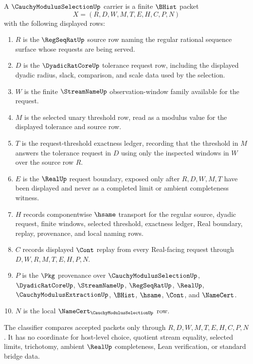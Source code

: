 \begin{definition}
\label{def:cauchy-modulus-selection-carrier}
A $\CauchyModulusSelectionUp$ carrier is a finite $\BHist$ packet
$$
X=(R,D,W,M,T,E,H,C,P,N)
$$
with the following displayed rows:
\begin{enumerate}
\item $R$ is the $\RegSeqRatUp$ source row naming the regular rational sequence surface whose requests are being served.
\item $D$ is the $\DyadicRatCoreUp$ tolerance request row, including the displayed dyadic radius, slack, comparison, and scale data used by the selection.
\item $W$ is the finite $\StreamNameUp$ observation-window family available for the request.
\item $M$ is the selected unary threshold row, read as a modulus value for the displayed tolerance and source row.
\item $T$ is the request-threshold exactness ledger, recording that the threshold in $M$ answers the tolerance request in $D$ using only the inspected windows in $W$ over the source row $R$.
\item $E$ is the $\RealUp$ request boundary, exposed only after $R,D,W,M,T$ have been displayed and never as a completed limit or ambient completeness witness.
\item $H$ records componentwise $\hsame$ transport for the regular source, dyadic request, finite windows, selected threshold, exactness ledger, Real boundary, replay, provenance, and local naming rows.
\item $C$ records displayed $\Cont$ replay from every Real-facing request through $D,W,R,M,T,E,H,P,N$.
\item $P$ is the $\Pkg$ provenance over $\CauchyModulusSelectionUp$, $\DyadicRatCoreUp$, $\StreamNameUp$, $\RegSeqRatUp$, $\RealUp$, $\CauchyModulusExtractionUp$, $\BHist$, $\hsame$, $\Cont$, and $\NameCert$.
\item $N$ is the local $\NameCert_{\CauchyModulusSelectionUp}$ row.
\end{enumerate}
The classifier compares accepted packets only through $R,D,W,M,T,E,H,C,P,N$. It has no coordinate for host-level choice, quotient stream equality, selected limits, trichotomy, ambient $\RealUp$ completeness, Lean verification, or standard bridge data.
\end{definition}

